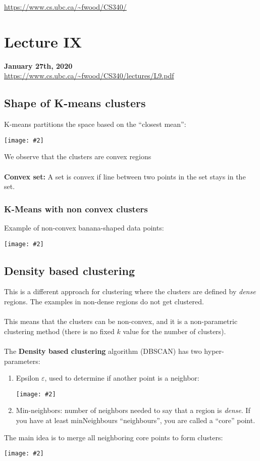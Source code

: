 \documentclass{article}
\def\blu#1{{\color{blu}#1}}
\def\gre#1{{\color{gre}#1}}
\theoremstyle{definition}
\newcommand{\centerfig}[2]{\begin{center}\texttt{[image: \#2]}\end{center}}
\begin{document}
\noindent \url{https://www.cs.ubc.ca/~fwood/CS340/}

\section*{Lecture IX}
\textbf{January 27th, 2020}\\
\url{https://www.cs.ubc.ca/~fwood/CS340/lectures/L9.pdf}

\subsection*{Shape of K-means clusters}
K-means \gre{partitions the space} based on the “closest mean”:
\centerfig{0.75}{Pic1}
We observe that the clusters are convex regions\\ \\
\textbf{Convex set:} A set is convex if line between two points in the set stays in the set.

\subsubsection*{K-Means with non convex clusters}
Example of non-convex banana-shaped data points:
\centerfig{0.450}{Pic2}

\subsection*{Density based clustering}
This is a different approach for clustering where the clusters are \gre{defined by \textsl{dense} regions}. The examples in non-dense regions do not get clustered. \\ \\
This means that the clusters can be \blu{non-convex}, and it is a \gre{non-parametric} clustering method (there is no fixed $ k $ value for the number of clusters). \\ \\
The \textbf{Density based clustering} algorithm (DBSCAN) has two hyper-parameters:
\begin{enumerate}
	\item \blu{Epsilon $ \varepsilon $}, used to determine if another point is a neighbor:
	\centerfig{0.4}{Pic3}
	\item \blu{Min-neighbors}: \gre{number of neighbors} needed to say that a region is \textit{dense}. If you have at least \gre{minNeighbours} “neighbours”, you are called a “\blu{core}” point. 
\end{enumerate}
The main idea is to \gre{merge all neighboring core points to form clusters}:
\centerfig{0.9}{Pic4} 
\end{document}
